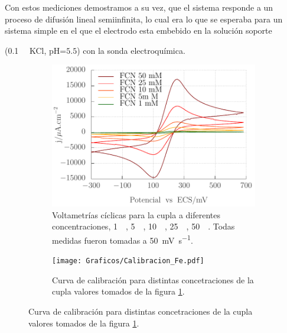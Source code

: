 		  Con estos mediciones demostramos a su vez, que el sistema responde a un proceso de difusión lineal semiinfinita, lo cual era lo que se esperaba para un sistema simple en el que el electrodo esta embebido en la solución soporte {(\SI{0,1}{\milli\Molar} KCl, pH=$5.5$) con la sonda electroquímica.

			\begin{figure}[ht]
	 	    	\begin{subfigure}[t]{0.5\textwidth}
	         	\includegraphics[width=\textwidth]{Graficos/Concentraciones_Fe.pdf}
	        	\caption{Voltametrías cíclicas para la cupla \fe\space a diferentes concentraciones, \SI{1}{\milli\Molar}, \SI{5}{\milli\Molar}, \SI{10}{\milli\Molar}, \SI{25}{\milli\Molar}, \SI{50}{\milli\Molar}. Todas medidas fueron tomadas a \SI{50}{\milli\volt\per\second}.}
	         	\label{fig:Fe_a}
	     		\end{subfigure}
     		 \begin{subfigure}[t]{0.495\textwidth}
	        	\texttt{[image: Graficos/Calibracion\_Fe.pdf]}
	       		\caption{Curva de calibración para distintas concetraciones de la cupla \fe\space valores tomados de la figura \ref{fig:Fe_a}.}
	         	\label{fig:Fe_b}
	     		\end{subfigure}


\end{figure}}
